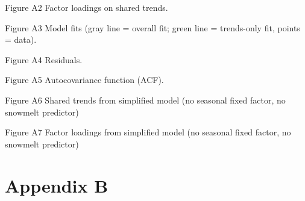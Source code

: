 \begin{center}
\end{center}
Figure A2 Factor loadings on shared trends.

\begin{center}

\end{center}
Figure A3 Model fits (gray line = overall fit; green line = trends-only fit, points = data).

\begin{center}

\end{center}
Figure A4 Residuals.

\begin{center}

\end{center}
Figure A5 Autocovariance function (ACF).

\begin{center}
\end{center}
Figure A6 Shared trends from simplified model (no seasonal fixed factor, no snowmelt predictor)

\begin{center}
\end{center}
Figure A7 Factor loadings from simplified model (no seasonal fixed factor, no snowmelt predictor)

\section*{Appendix B}

